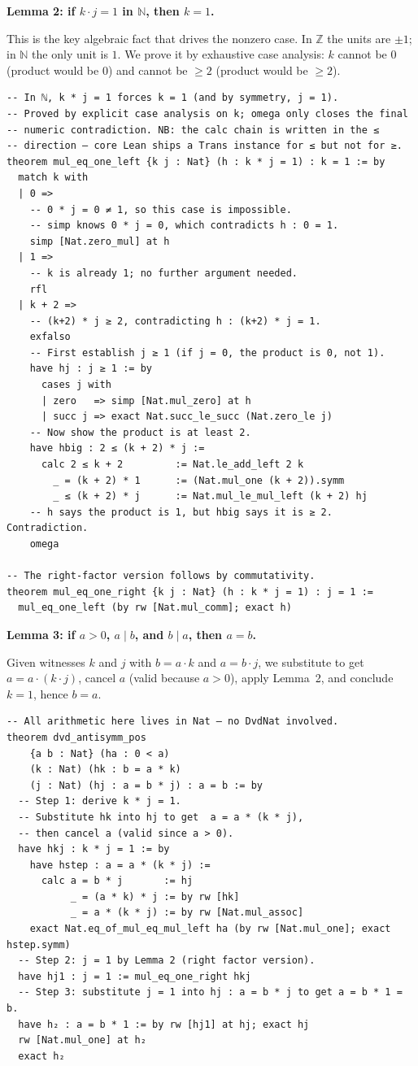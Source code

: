 \documentclass[12pt, a4paper, openright]{book}
\theoremstyle{thmstyle}
\theoremstyle{defstyle}
\begin{document}
\medskip
\textbf{Lemma 2: if $k \cdot j = 1$ in $\mathbb{N}$, then $k = 1$.}

This is the key algebraic fact that drives the nonzero case. In $\mathbb{Z}$ the
units are $\pm 1$; in $\mathbb{N}$ the only unit is $1$. We prove it by
exhaustive case analysis: $k$ cannot be $0$ (product would be $0$) and cannot
be $\geq 2$ (product would be $\geq 2$).

\begin{verbatim}
-- In ℕ, k * j = 1 forces k = 1 (and by symmetry, j = 1).
-- Proved by explicit case analysis on k; omega only closes the final
-- numeric contradiction. NB: the calc chain is written in the ≤
-- direction — core Lean ships a Trans instance for ≤ but not for ≥.
theorem mul_eq_one_left {k j : Nat} (h : k * j = 1) : k = 1 := by
  match k with
  | 0 =>
    -- 0 * j = 0 ≠ 1, so this case is impossible.
    -- simp knows 0 * j = 0, which contradicts h : 0 = 1.
    simp [Nat.zero_mul] at h
  | 1 =>
    -- k is already 1; no further argument needed.
    rfl
  | k + 2 =>
    -- (k+2) * j ≥ 2, contradicting h : (k+2) * j = 1.
    exfalso
    -- First establish j ≥ 1 (if j = 0, the product is 0, not 1).
    have hj : j ≥ 1 := by
      cases j with
      | zero   => simp [Nat.mul_zero] at h
      | succ j => exact Nat.succ_le_succ (Nat.zero_le j)
    -- Now show the product is at least 2.
    have hbig : 2 ≤ (k + 2) * j :=
      calc 2 ≤ k + 2         := Nat.le_add_left 2 k
        _ = (k + 2) * 1      := (Nat.mul_one (k + 2)).symm
        _ ≤ (k + 2) * j      := Nat.mul_le_mul_left (k + 2) hj
    -- h says the product is 1, but hbig says it is ≥ 2. Contradiction.
    omega

-- The right-factor version follows by commutativity.
theorem mul_eq_one_right {k j : Nat} (h : k * j = 1) : j = 1 :=
  mul_eq_one_left (by rw [Nat.mul_comm]; exact h)
\end{verbatim}

\medskip
\textbf{Lemma 3: if $a > 0$, $a \mid b$, and $b \mid a$, then $a = b$.}

Given witnesses $k$ and $j$ with $b = a \cdot k$ and $a = b \cdot j$, we
substitute to get $a = a \cdot (k \cdot j)$, cancel $a$ (valid because $a >
0$), apply Lemma~2, and conclude $k = 1$, hence $b = a$.

\begin{verbatim}
-- All arithmetic here lives in Nat — no DvdNat involved.
theorem dvd_antisymm_pos
    {a b : Nat} (ha : 0 < a)
    (k : Nat) (hk : b = a * k)
    (j : Nat) (hj : a = b * j) : a = b := by
  -- Step 1: derive k * j = 1.
  -- Substitute hk into hj to get  a = a * (k * j),
  -- then cancel a (valid since a > 0).
  have hkj : k * j = 1 := by
    have hstep : a = a * (k * j) :=
      calc a = b * j       := hj
           _ = (a * k) * j := by rw [hk]
           _ = a * (k * j) := by rw [Nat.mul_assoc]
    exact Nat.eq_of_mul_eq_mul_left ha (by rw [Nat.mul_one]; exact hstep.symm)
  -- Step 2: j = 1 by Lemma 2 (right factor version).
  have hj1 : j = 1 := mul_eq_one_right hkj
  -- Step 3: substitute j = 1 into hj : a = b * j to get a = b * 1 = b.
  have h₂ : a = b * 1 := by rw [hj1] at hj; exact hj
  rw [Nat.mul_one] at h₂
  exact h₂
\end{verbatim}
\end{document}
